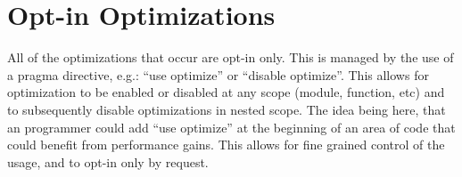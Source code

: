 \section{Opt-in Optimizations}
All of the optimizations that occur are opt-in only.  This is managed by the use of a \javascript pragma directive, e.g.: ``use optimize'' or ``disable optimize''.  This allows for optimization to be enabled or disabled at any scope (module, function, etc) and to subsequently disable optimizations in nested scope.  The idea being here, that an programmer could add ``use optimize'' at the beginning of an area of code that could benefit from performance gains.  This allows for fine grained control of the usage, and to opt-in only by request.